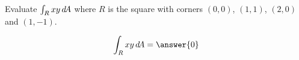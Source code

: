 \documentclass{ximera}
\author{David Guichard \and Neal Koblitz \and H. Jerome Keisler \and Albert Scheller \and Barry Balof \and Mike Wills \and Matthew Carr}
\begin{document}
\begin{exercise}




Evaluate $\int_R xy \mathop{}\!d\! A$ where $R$ is the square with corners
$(0,0)$, $(1,1)$, $(2,0)$ and $(1,-1)$.

\begin{prompt}
\[
\int_R xy \d A=\answer{0}
\]
\end{prompt}



\end{exercise}
\end{document}
